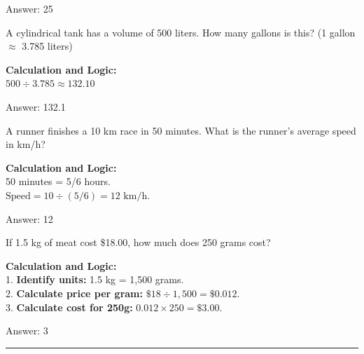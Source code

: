 \documentclass[11pt,paper=a4,answers]{exam}
\begin{document}
\begin{questions}
\begin{solution}
Answer: \colorbox{yellow!100}{25}
\end{solution}

\vspace{60pt}

\question
A cylindrical tank has a volume of 500 liters. How many gallons is this? (1 gallon $\approx$ 3.785 liters)

\begin{solution}
\textbf{Calculation and Logic:} \\
$500 \div 3.785 \approx 132.10$

\vspace{30pt}

Answer: \colorbox{yellow!100}{132.1}
\end{solution}

\vspace{60pt}

\question
A runner finishes a 10 km race in 50 minutes. What is the runner's average speed in km/h?

\begin{solution}
\textbf{Calculation and Logic:} \\
50 minutes = 5/6 hours. \\
$\text{Speed} = 10 \div (5/6) = 12 \text{ km/h}$.

\vspace{30pt}

Answer: \colorbox{yellow!100}{12}
\end{solution}

\vspace{60pt}

\question
If 1.5 kg of meat cost \$18.00, how much does 250 grams cost?

\begin{solution}
\textbf{Calculation and Logic:} \\
1. \textbf{Identify units:} 1.5 kg = 1,500 grams. \\
2. \textbf{Calculate price per gram:} $\$18 \div 1,500 = \$0.012$. \\
3. \textbf{Calculate cost for 250g:} $0.012 \times 250 = \$3.00$.

\vspace{30pt}

Answer: \colorbox{yellow!100}{3}
\end{solution}


\end{questions}
\begin{center}
\rule{.5\textwidth}{1pt}
\end{center}
\end{document}
